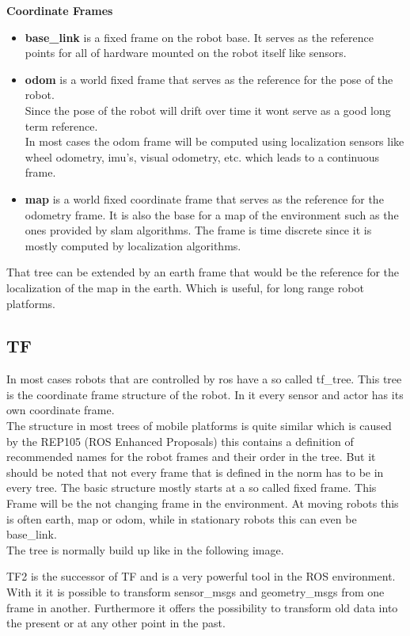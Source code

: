 	\textbf{Coordinate Frames}
	\begin{itemize}
		\item \textbf{base\_link} is a fixed frame on the robot base. It serves as the reference points for all of hardware mounted on the robot itself like sensors.
		\item \textbf{odom} is a world fixed frame that serves as the reference for the pose of the robot.\\ Since the pose of the robot will drift over time it wont serve as a good long term reference.\\In most cases the odom frame will be computed using localization sensors like wheel odometry, imu's, visual odometry, etc. which leads to a continuous frame.
		\item \textbf{map} is a world fixed coordinate frame that serves as the reference for the odometry frame. It is also the base for a map of the environment such as the ones provided by slam algorithms. The frame is time discrete since it is mostly computed by localization algorithms.
	\end{itemize}
	
	That tree can be extended by an earth frame that would be the reference for the localization of the map in the earth. Which is useful, for long range robot platforms.\cite{REP105}
	
	
	
\subsection{TF}
In most cases robots that are controlled by ros have a so called tf\_tree. This tree is the coordinate frame structure of the robot. In it every sensor and actor has its own coordinate frame.\\
 The structure in most trees of mobile platforms is quite similar which is caused by the REP105 (ROS Enhanced Proposals) this contains a definition of recommended names for the robot frames and their order in the tree. But it should be noted that not every frame that is defined in the norm has to be in every tree. The basic structure mostly starts at a so called fixed frame. This Frame will be the not changing frame in the environment. At moving robots this is often earth, map or odom, while in stationary robots this can even be base\_link.\\
 

The tree is normally build up like in the following image. 

TF2 is the successor of TF and is a very powerful tool in the ROS environment. With it it is possible to transform sensor\_msgs and geometry\_msgs from one frame in another. Furthermore it offers the possibility to transform old data into the present or at any other point in the past.

